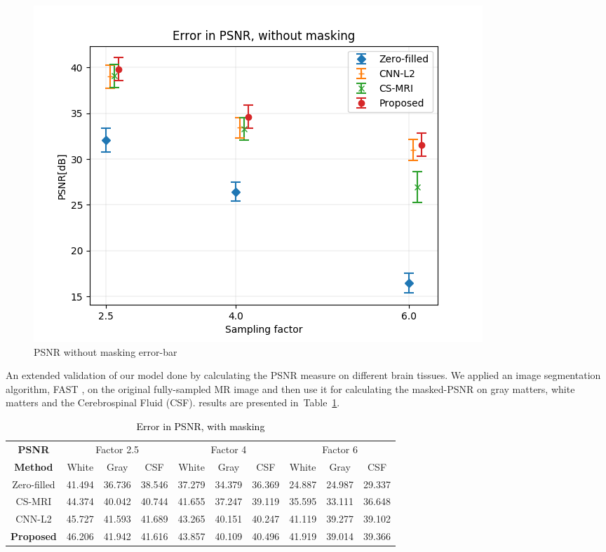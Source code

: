 \documentclass[review]{elsarticle}
\begin{document}
\begin{figure}[H]
\centering
\includegraphics[width=0.7\linewidth]{include/grp2/error_psnr_errorbar}
\caption{PSNR without masking error-bar}
\end{figure}\label{fig:error_psnr_errorbar}

An extended validation of our model done by calculating the PSNR measure on different brain tissues. We applied an image segmentation algorithm, FAST \cite{zhang2001segmentation}, on the original fully-sampled MR image and then use it for calculating the masked-PSNR on gray matters, white matters and the Cerebrospinal Fluid (CSF). results are presented in~Table~\ref{tbl:PSNR_WITH_MASK}.


\begin{table}[H]
	\centering
\begin{tabular}{|c||c|c|c||c|c|c||c|c|c|}
	\hline 
	\textbf{PSNR} & \multicolumn{3}{c||}{Factor 2.5} & \multicolumn{3}{c||}{Factor 4} & \multicolumn{3}{c|}{Factor 6}\tabularnewline
	\cline{2-10} 
	 \textbf{Method}& White & Gray & CSF & White & Gray & CSF & White & Gray & CSF\tabularnewline
	 \hline 
	 Zero-filled & 41.494 & 36.736 & 38.546 & 37.279 & 34.379 & 36.369 & 24.887 & 24.987 & 29.337\tabularnewline
	 \hline 
	 CS-MRI & 44.374 & 40.042 & 40.744 & 41.655 & 37.247 & 39.119 & 35.595 & 33.111 & 36.648\tabularnewline
	 \hline 
	 CNN-L2 & 45.727 & 41.593 & 41.689 & 43.265 & 40.151 & 40.247 & 41.119 & 39.277 & 39.102\tabularnewline
	 \hline 
	 \textbf{Proposed} & 46.206 & 41.942 & 41.616 & 43.857 & 40.109 & 40.496 & 41.919 & 39.014 & 39.366\tabularnewline
	 \hline 
\end{tabular}
\caption{\textcolor{black}{\footnotesize{}{}Error in PSNR, with masking}{\footnotesize{}\label{tbl:PSNR_WITH_MASK}}}
\end{table}

\end{document}

